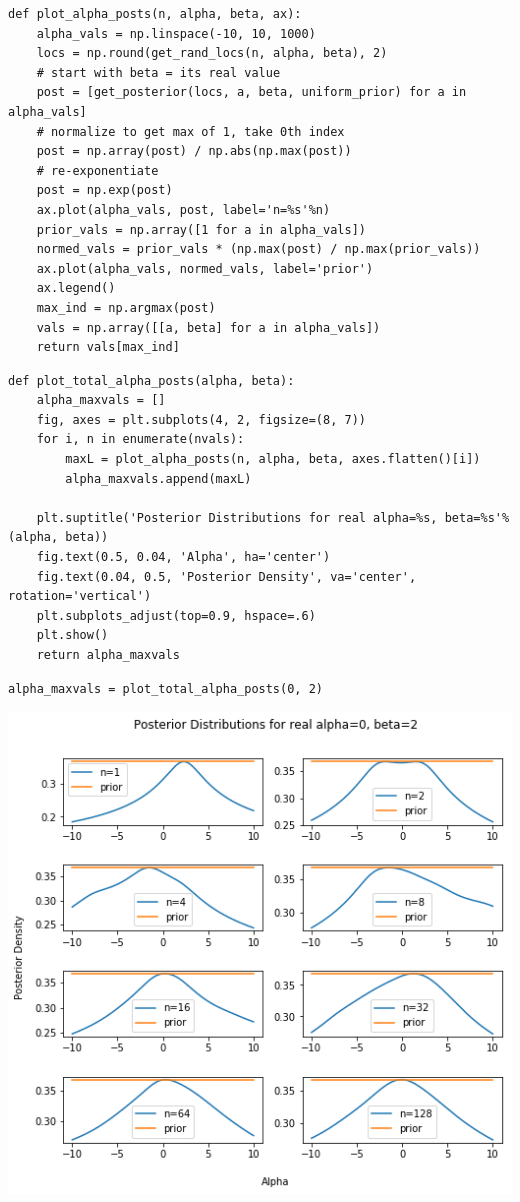 \documentclass[11pt]{article}
\begin{document}
\begin{verbatim}
def plot_alpha_posts(n, alpha, beta, ax):
    alpha_vals = np.linspace(-10, 10, 1000)
    locs = np.round(get_rand_locs(n, alpha, beta), 2)
    # start with beta = its real value
    post = [get_posterior(locs, a, beta, uniform_prior) for a in alpha_vals]
    # normalize to get max of 1, take 0th index
    post = np.array(post) / np.abs(np.max(post))
    # re-exponentiate
    post = np.exp(post)
    ax.plot(alpha_vals, post, label='n=%s'%n)
    prior_vals = np.array([1 for a in alpha_vals])
    normed_vals = prior_vals * (np.max(post) / np.max(prior_vals))
    ax.plot(alpha_vals, normed_vals, label='prior')
    ax.legend()
    max_ind = np.argmax(post)
    vals = np.array([[a, beta] for a in alpha_vals])
    return vals[max_ind]
\end{verbatim}


\begin{verbatim}
def plot_total_alpha_posts(alpha, beta):
    alpha_maxvals = []
    fig, axes = plt.subplots(4, 2, figsize=(8, 7))
    for i, n in enumerate(nvals):
        maxL = plot_alpha_posts(n, alpha, beta, axes.flatten()[i])
        alpha_maxvals.append(maxL)

    plt.suptitle('Posterior Distributions for real alpha=%s, beta=%s'%(alpha, beta))
    fig.text(0.5, 0.04, 'Alpha', ha='center')
    fig.text(0.04, 0.5, 'Posterior Density', va='center', rotation='vertical')
    plt.subplots_adjust(top=0.9, hspace=.6)
    plt.show()
    return alpha_maxvals
\end{verbatim}


\begin{verbatim}
alpha_maxvals = plot_total_alpha_posts(0, 2)
\end{verbatim}

\includegraphics[width=.9\linewidth]{./obipy-resources/322i00.png}
\end{document}
